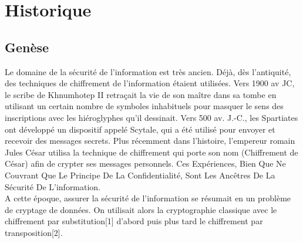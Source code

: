 \chapter{Historique}

\section{Genèse}
Le domaine de la sécurité de l'information est très ancien. Déjà, dès l’antiquité, des techniques de chiffrement de l’information étaient utilisées. Vers 1900 av JC, le scribe de Khnumhotep II retraçait la vie de son maître dans sa tombe en utilisant un certain nombre de symboles inhabituels pour masquer le sens des inscriptions avec les hiéroglyphes qu’il dessinait. Vers 500 av. J.-C., les Spartiates ont développé un dispositif appelé Scytale, qui a été utilisé pour envoyer et recevoir des messages secrets. Plus récemment dans l’histoire, l’empereur romain Jules César utilisa la technique de chiffrement qui porte son nom (Chiffrement de César) afin de crypter ses messages personnels. Ces Expériences, Bien Que Ne Couvrant Que Le Principe De La Confidentialité, Sont Les Ancêtres De La Sécurité De L’information.\\
A cette époque, assurer la sécurité de l’information se résumait en un problème de cryptage de données. On utilisait alors la cryptographie classique avec le chiffrement par substitution[1] d’abord  puis plus tard le chiffrement par transposition[2].

